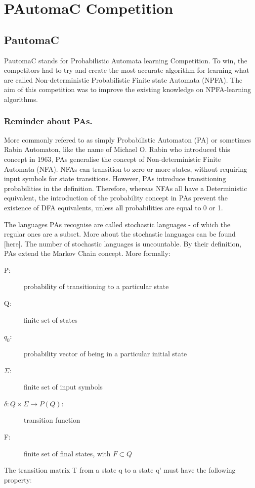 \section{PAutomaC Competition}

\subsection{{\LARGE{}PautomaC}}

\enskip{}\quad{}PautomaC stands for Probabilistic Automata learning
Competition. To win, the competitors had to try and create the most
accurate algorithm for learning what are called Non-deterministic
Probabilistic Finite state Automata (NPFA). The aim of this competition
was to improve the existing knowledge on NPFA-learning algorithms.


\subsubsection{{\Large{}Reminder about PAs.}}

\quad{}\enskip{}More commonly refered to as simply Probabilistic
Automaton (PA) or sometimes Rabin Automaton, like the name of Michael
O. Rabin who introduced this concept in 1963, PAs generalise the concept
of Non-deterministic Finite Automata (NFA). NFAs can transition to
zero or more states, without requiring input symbols for state transitions.
However, PAs introduce transitioning probabilities in the definition.
Therefore, whereas NFAs all have a Deterministic equivalent, the introduction
of the probability concept in PAs prevent the existence of DFA equivalents,
unless all probabilities are equal to 0 or 1.

The languages PAs recognise are called stochastic languages - of which
the regular ones are a subset. More about the stochastic languages
can be found {[}here{]}. The number of stochastic languages is uncountable.
By their definition, PAs extend the Markov Chain concept. More formally:
\begin{description}
\item [{P:}] probability of transitioning to a particular state
\item [{Q:}] finite set of states
\item [{$q_{0}$:}] probability vector of being in a particular initial
state
\item [{$\varSigma$:}] finite set of input symbols
\item [{$\delta:Q\times\varSigma\longrightarrow P(Q)$:}] transition function
\item [{F:}] finite set of final states, with $F\subset Q$
\end{description}
The transition matrix T from a state q to a state q' must have the
following property:

